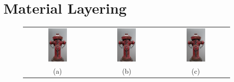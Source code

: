 \chapter{Material Layering}\label{cha:materialLayering}

	\begin{figure}
		\centering\small 
		\begin{tabular}{@{}ccc@{}}
			\includegraphics[width=0.3\textwidth]{images/03cha_01_04b_bxdfLayering_noNormal.jpg} &
			\includegraphics[width=0.3\textwidth]{images/03cha_01_04b_PatternLayering_noNormal.jpg} &
			\includegraphics[width=0.3\textwidth]{images/03cha_01_04b_combined_linearInt2_noNormal.jpg} \\[6pt]
			(a) & (b) & (c) 
		\end{tabular}


\end{figure}
